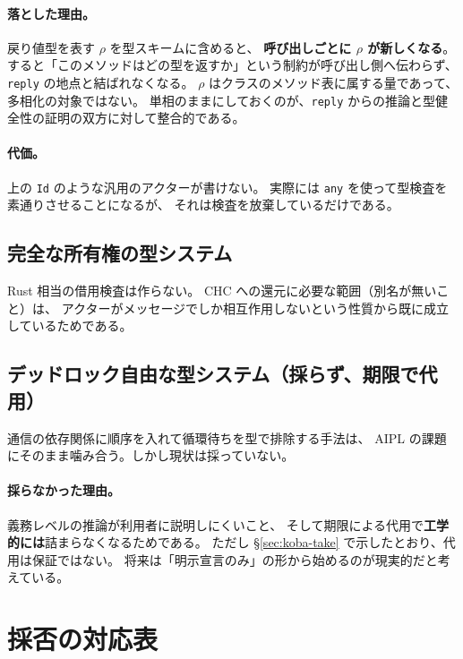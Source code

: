 \documentclass[11pt,a4paper]{ltjsarticle}
\theoremstyle{definition}
\theoremstyle{remark}
\begin{document}
\paragraph{落とした理由。}
戻り値型を表す $\rho$ を型スキームに含めると、
\textbf{呼び出しごとに $\rho$ が新しくなる}。
すると「このメソッドはどの型を返すか」という制約が呼び出し側へ伝わらず、
\texttt{reply} の地点と結ばれなくなる。
$\rho$ はクラスのメソッド表に属する量であって、多相化の対象ではない。
単相のままにしておくのが、\texttt{reply} からの推論と型健全性の証明の双方に対して整合的である。

\paragraph{代価。}
上の \texttt{Id} のような汎用のアクターが書けない。
実際には \texttt{any} を使って型検査を素通りさせることになるが、
それは検査を放棄しているだけである。

\subsection{完全な所有権の型システム}

Rust 相当の借用検査は作らない。
CHC への還元に必要な範囲（別名が無いこと）は、
アクターがメッセージでしか相互作用しないという性質から既に成立しているためである。

\subsection{デッドロック自由な型システム（採らず、期限で代用）}

通信の依存関係に順序を入れて循環待ちを型で排除する手法は、
AIPL の課題にそのまま噛み合う。しかし現状は採っていない。

\paragraph{採らなかった理由。}
義務レベルの推論が利用者に説明しにくいこと、
そして期限による代用で\textbf{工学的には}詰まらなくなるためである。
ただし \S\ref{sec:koba-take} で示したとおり、代用は保証ではない。
将来は「明示宣言のみ」の形から始めるのが現実的だと考えている。

\section{採否の対応表}
\label{sec:table}
\end{document}
